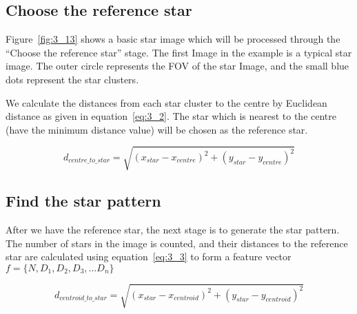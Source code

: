 



\subsection{Choose the reference star}

Figure~\ref{fig:3_13} shows a basic star image which will be processed through the “Choose the reference star” stage. The first Image in the example is a typical star image. The outer circle represents the FOV of the star Image, and the small blue dots represent the star clusters. 


\noindent We calculate the distances from each star cluster to the centre by Euclidean distance as given in equation~\ref{eq:3_2}. The star which is nearest to the centre (have the minimum distance value) will be chosen as the reference star.

\begin{equation}
	d_{centre\_to\_star} = \sqrt{(x_{star} - x_{centre})^2 + (y_{star} - y_{centre})^2}
	\label{eq:3_2}
\end{equation}

\subsection{Find the star pattern}

After we have the reference star, the next stage is to generate the star pattern. The number of stars in the image is counted, and their distances to the reference star are calculated using equation~\ref{eq:3_3} to form a feature vector $f = \{N, D_1, D_2, D_3, … D_n\}$

\begin{equation}
	d_{centroid\_to\_star} = \sqrt{(x_{star} - x_{centroid})^2 + (y_{star} - y_{centroid})^2}
	\label{eq:3_3}
\end{equation}


